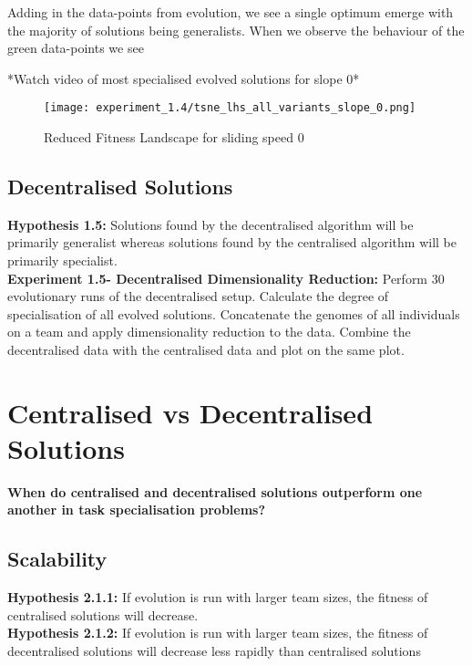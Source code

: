 \documentclass[12pt]{article}
\begin{document}
Adding in the data-points from evolution, we see a single optimum emerge with the majority of solutions being generalists.
When we observe the behaviour of the green data-points we see

*Watch video of most specialised evolved solutions for slope 0*


\begin{figure}[h]
\centering
\texttt{[image: experiment\_1.4/tsne\_lhs\_all\_variants\_slope\_0.png]}
\caption{Reduced Fitness Landscape for sliding speed 0}
\label{fig:tsne_slope_0}
\end{figure}

\subsection{Decentralised Solutions} 

\textbf{Hypothesis 1.5:} Solutions found by the decentralised algorithm will be primarily generalist whereas solutions found by the centralised algorithm will be primarily specialist.\\

\textbf{Experiment 1.5- Decentralised Dimensionality Reduction:} Perform 30 evolutionary runs of the decentralised setup.
Calculate the degree of specialisation of all evolved solutions.
Concatenate the genomes of all individuals on a team and apply dimensionality reduction to the data.
Combine the decentralised data with the centralised data and plot on the same plot.\\

\section{Centralised vs Decentralised Solutions}

\textbf{When do centralised and decentralised solutions outperform one another in task specialisation problems?}\\

\subsection{Scalability}

\textbf{Hypothesis 2.1.1:} If evolution is run with larger team sizes, the fitness of centralised solutions will decrease.\\

\textbf{Hypothesis 2.1.2:} If evolution is run with larger team sizes, the fitness of decentralised solutions will decrease less rapidly than centralised solutions\\
\end{document}
